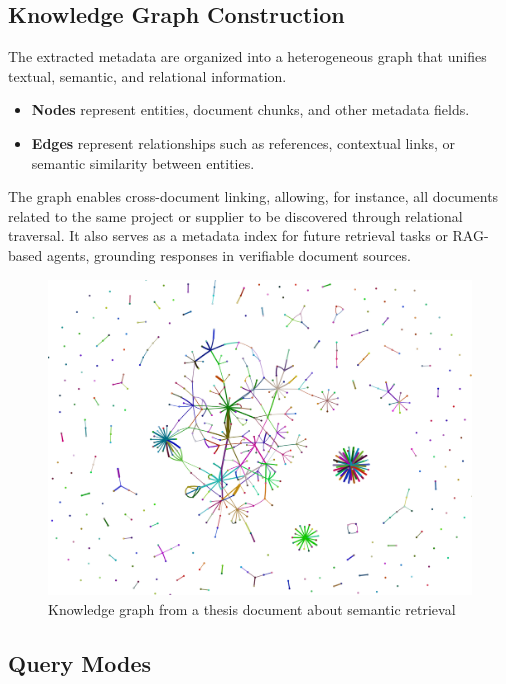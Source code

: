 \subsection{Knowledge Graph Construction}
The extracted metadata are organized into a heterogeneous graph that unifies textual, semantic, and relational information.

\begin{itemize}
    \item \textbf{Nodes} represent entities, document chunks, and other metadata fields.
    \item \textbf{Edges} represent relationships such as references, contextual links, or semantic similarity between entities.
\end{itemize}

The graph enables cross-document linking, allowing, for instance, all documents related  to the same project or supplier to be discovered through relational traversal.  
It also serves as a metadata index for future retrieval tasks or RAG-based agents, grounding responses in verifiable document sources.

\begin{figure}[H]
    \centering
    \includegraphics[width=0.5\linewidth]{Images/graph_visualisation_big.png}
    \caption{Knowledge graph from a thesis document about semantic retrieval}\label{fig:knowledge-graph}
\end{figure}

\subsection{Query Modes}

